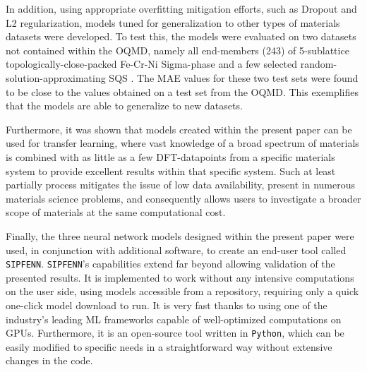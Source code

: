 In addition, using appropriate overfitting mitigation efforts, such as Dropout and L2 regularization, models tuned for generalization to other types of materials datasets were developed. To test this, the models were evaluated on two datasets not contained within the OQMD, namely all end-members (243) of 5-sublattice topologically-close-packed Fe-Cr-Ni Sigma-phase \cite{Feurer2019Cr-Fe-NiCalculations, Hsieh2012OverviewSteels} and a few selected random-solution-approximating SQS \cite{Zunger1990SpecialStructures, Shin2006ThermodynamicStructures, Jiang2004First-principlesStructures}. The MAE values for these two test sets were found to be close to the values obtained on a test set from the OQMD. This exemplifies that the models are able to generalize to new datasets.

Furthermore, it was shown that models created within the present paper can be used for transfer learning, where vast knowledge of a broad spectrum of materials is combined with as little as a few DFT-datapoints from a specific materials system to provide excellent results within that specific system. Such at least partially process mitigates the issue of low data availability, present in numerous materials science problems, and consequently allows users to investigate a broader scope of materials at the same computational cost.

Finally, the three neural network models designed within the present paper were used, in conjunction with additional software, to create an end-user tool called \texttt{SIPFENN}. \texttt{SIPFENN}'s capabilities extend far beyond allowing validation of the presented results. It is implemented to work without any intensive computations on the user side, using models accessible from a repository, requiring only a quick one-click model download  to run. It is very fast thanks to using one of the industry's leading ML frameworks capable of well-optimized computations on GPUs. Furthermore, it is an open-source tool written in \texttt{Python}, which can be easily modified to specific needs in a straightforward way without extensive changes in the code.


